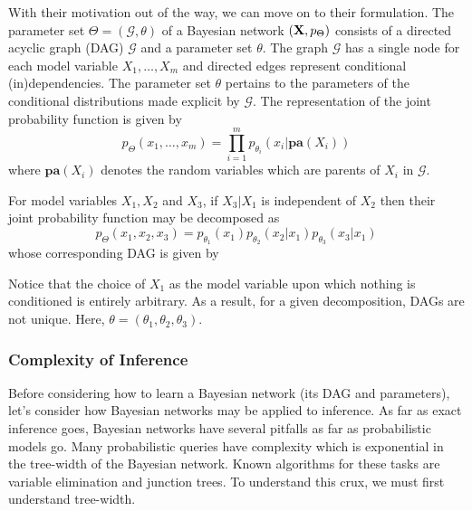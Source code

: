 \documentclass[11pt]{article}
\begin{document}
With their motivation out of the way, we can move on to their formulation. The parameter set $\Theta=(\mathcal{G},\theta)$ of a Bayesian network $(\mathbf{X},p_\Theta)$ consists of a directed acyclic graph (DAG) $\mathcal{G}$ and a parameter set $\theta$. The graph $\mathcal{G}$ has a single node for each model variable $X_1,\dots,X_m$ and directed edges represent conditional (in)dependencies. The parameter set $\theta$ pertains to the parameters of the conditional distributions made explicit by $\mathcal{G}$. The representation of the joint probability function is given by
$$
p_{\Theta}(x_1,\dots,x_m)
=
\prod_{i=1}^m p_{\theta_i}(x_i|\textbf{pa}(X_i))
$$
where $\textbf{pa}(X_i)$ denotes the random variables which are parents of $X_i$ in $\mathcal{G}$.
\begin{example}
    For model variables $X_1, X_2$ and $X_3$, if $X_3|X_1$ is independent of $X_2$ then their joint probability function may be decomposed as
    $$
    p_{\Theta}(x_1,x_2,x_3)
    =
    p_{\theta_1}(x_1)p_{\theta_2}(x_2|x_1)p_{\theta_3}(x_3|x_1)
    $$
    whose corresponding DAG is given by
    \begin{center}
    \end{center}
    Notice that the choice of $X_1$ as the model variable upon which nothing is conditioned is entirely arbitrary. As a result, for a given decomposition, DAGs are not unique. Here, $\theta=(\theta_1,\theta_2,\theta_3)$.
\end{example}

\subsubsection{\TODO Complexity of Inference}
Before considering how to learn a Bayesian network (its DAG and parameters), let's consider how Bayesian networks may be applied to inference. As far as exact inference goes, Bayesian networks have several pitfalls as far as probabilistic models go. Many probabilistic queries have complexity which is exponential in the tree-width of the Bayesian network. Known algorithms for these tasks are variable elimination and junction trees. To understand this crux, we must first understand tree-width.
\end{document}
